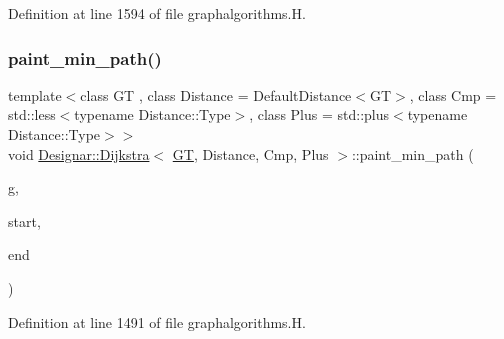 Definition at line 1594 of file graphalgorithms.\+H.

\mbox{\label{class_designar_1_1_dijkstra_a103839d3bd4e6d8733d2b47b186e137a}} 
\subsubsection{\texorpdfstring{paint\+\_\+min\+\_\+path()}{paint\_min\_path()}}
{\footnotesize\ttfamily template$<$class GT , class Distance  = Default\+Distance$<$\+G\+T$>$, class Cmp  = std\+::less$<$typename Distance\+::\+Type$>$, class Plus  = std\+::plus$<$typename Distance\+::\+Type$>$$>$ \\
void \hyperlink{class_designar_1_1_dijkstra}{Designar\+::\+Dijkstra}$<$ \hyperlink{demo-buildgraph_8_c_a3001c40d2c31ca87ed96cd7d1334a55e}{GT}, Distance, Cmp, Plus $>$\+::paint\+\_\+min\+\_\+path (\begin{DoxyParamCaption}\item[{\hyperlink{demo-buildgraph_8_c_a3001c40d2c31ca87ed96cd7d1334a55e}{GT} \&}]{g,  }\item[{\hyperlink{class_designar_1_1_dijkstra_afeb644fc5395569ec366f0d220ab477d}{Node} \&}]{start,  }\item[{\hyperlink{class_designar_1_1_dijkstra_afeb644fc5395569ec366f0d220ab477d}{Node} \&}]{end }\end{DoxyParamCaption})\hspace{0.3cm}{\ttfamily [inline]}}



Definition at line 1491 of file graphalgorithms.\+H.

\mbox{\label{class_designar_1_1_dijkstra_a607872c03f2e6de59936118e6f6c8790}} 
